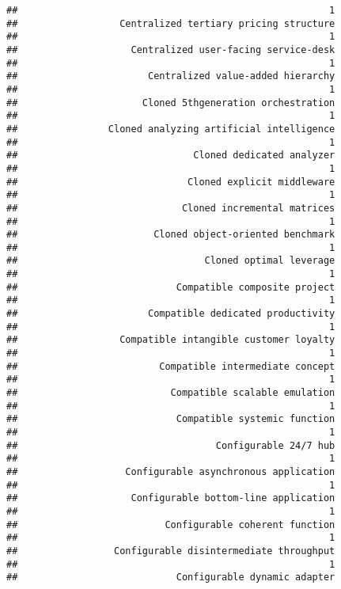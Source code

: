 \documentclass[
]{article}
\begin{document}
\begin{verbatim}
##                                                       1 
##                  Centralized tertiary pricing structure 
##                                                       1 
##                    Centralized user-facing service-desk 
##                                                       1 
##                       Centralized value-added hierarchy 
##                                                       1 
##                      Cloned 5thgeneration orchestration 
##                                                       1 
##                Cloned analyzing artificial intelligence 
##                                                       1 
##                               Cloned dedicated analyzer 
##                                                       1 
##                              Cloned explicit middleware 
##                                                       1 
##                             Cloned incremental matrices 
##                                                       1 
##                        Cloned object-oriented benchmark 
##                                                       1 
##                                 Cloned optimal leverage 
##                                                       1 
##                            Compatible composite project 
##                                                       1 
##                       Compatible dedicated productivity 
##                                                       1 
##                  Compatible intangible customer loyalty 
##                                                       1 
##                         Compatible intermediate concept 
##                                                       1 
##                           Compatible scalable emulation 
##                                                       1 
##                            Compatible systemic function 
##                                                       1 
##                                   Configurable 24/7 hub 
##                                                       1 
##                   Configurable asynchronous application 
##                                                       1 
##                    Configurable bottom-line application 
##                                                       1 
##                          Configurable coherent function 
##                                                       1 
##                 Configurable disintermediate throughput 
##                                                       1 
##                            Configurable dynamic adapter 

\end{verbatim}
\end{document}
